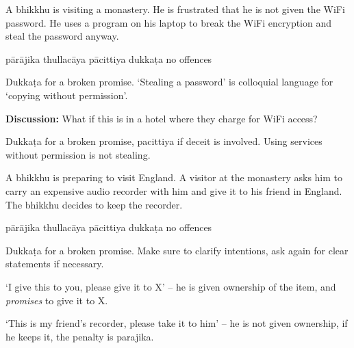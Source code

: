 \begin{exam}{\autoExamName}
\begin{problem*}
\begin{parts}
  \bigskip

  \item A bhikkhu is visiting a monastery. He is frustrated that he is not given
    the WiFi password. He uses a program on his laptop to break the WiFi encryption
    and steal the password anyway.

  \bigskip

  \begin{answers}{5}
    \bChoices
     pārājika\eAns
     thullacāya\eAns
     pācittiya\eAns
     dukkaṭa\eAns
     no offences\eAns
    \eChoices
  \end{answers}

  \begin{solution}
    Dukkaṭa for a broken promise. `Stealing a password' is colloquial language
    for `copying without permission'.
  \end{solution}

  \bigskip

  \textbf{Discussion:} What if this is in a hotel where they charge for WiFi access?

  \begin{solution}
    Dukkaṭa for a broken promise, pacittiya if deceit is involved. Using services without permission is not stealing.
  \end{solution}

  \bigskip

  \item A bhikkhu is preparing to visit England. A visitor at the monastery asks
    him to carry an expensive audio recorder with him and give it to his friend in
    England. The bhikkhu decides to keep the recorder.

  \bigskip

  \begin{answers}{5}
    \bChoices
     pārājika\eAns
     thullacāya\eAns
     pācittiya\eAns
     dukkaṭa\eAns
     no offences\eAns
    \eChoices
  \end{answers}

  \begin{solution}
    Dukkaṭa for a broken promise. Make sure to clarify intentions, ask again for
    clear statements if necessary.

    `I give this to you, please give it to X' -- he is given ownership of the
    item, and \emph{promises} to give it to X.

    `This is my friend's recorder, please take it to him' -- he is not given
    ownership, if he keeps it, the penalty is parajika.
  \end{solution}


\end{parts}
\end{problem*}
\end{exam}
